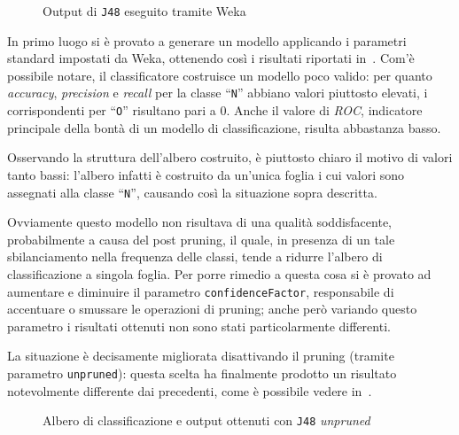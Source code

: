 \begin{figure}[H]
  \centering
  \caption{Output di \texttt{J48} eseguito tramite Weka}%
  \label{fig:j48}
\end{figure}

In primo luogo si è provato a generare un modello applicando i parametri standard impostati da Weka, ottenendo così i risultati riportati in~.
Com'è possibile notare, il classificatore costruisce un modello poco valido:
per quanto \emph{accuracy}, \emph{precision} e \emph{recall} per la classe ``\texttt{N}'' abbiano valori piuttosto elevati,
i corrispondenti per ``\texttt{O}'' risultano pari a \(0\).
Anche il valore di \emph{ROC}, indicatore principale della bontà di un modello di classificazione, risulta abbastanza basso.

Osservando la struttura dell'albero costruito, è piuttosto chiaro il motivo di valori tanto bassi:
l'albero infatti è costruito da un'unica foglia i cui valori sono assegnati alla classe ``\texttt{N}'', causando così la situazione sopra descritta.

Ovviamente questo modello non risultava di una qualità soddisfacente, probabilmente a causa del post pruning,
il quale, in presenza di un tale sbilanciamento nella frequenza delle classi, tende a ridurre l'albero di classificazione a singola foglia.
Per porre rimedio a questa cosa si è provato ad aumentare e diminuire il parametro \texttt{confidenceFactor}, responsabile di accentuare o smussare le operazioni di pruning;
anche però variando questo parametro i risultati ottenuti non sono stati particolarmente differenti.

La situazione è decisamente migliorata disattivando il pruning (tramite parametro \texttt{unpruned}):
questa scelta ha finalmente prodotto un risultato notevolmente differente dai precedenti, come è possibile vedere in~.

\begin{figure}[H]
  \centering
  \begin{subfigure}{0.35\textwidth}
    \centering
    \label{fig:j48-unpruned:tree}
  \end{subfigure}
  \hfill
  \begin{subfigure}{0.6\textwidth}
    \centering
    \label{subfig:j48-unpruned:result}
  \end{subfigure}
  \caption{Albero di classificazione e output ottenuti con \texttt{J48} \emph{unpruned}}%
  \label{fig:j48-unpruned}
\end{figure}

